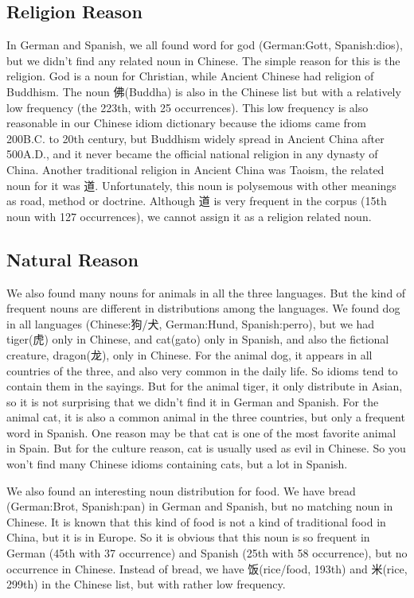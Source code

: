 \subsection{Religion Reason}
In German and Spanish, we all found word for god (German:Gott, Spanish:dios), but we didn't find any related noun in Chinese. The simple reason for this is the religion. God is a noun for Christian, while Ancient Chinese had religion of Buddhism. The noun 佛(Buddha) is also in the Chinese list but with a relatively low frequency (the 223th, with 25 occurrences). This low frequency is also reasonable in our Chinese idiom dictionary because the idioms came from 200B.C. to 20th century, but Buddhism widely spread in Ancient China after 500A.D., and it never became the official national religion in any dynasty of China. Another traditional religion in Ancient China was Taoism, the related noun for it was 道. Unfortunately, this noun is polysemous with other meanings as road, method or doctrine. Although 道 is very frequent in the corpus (15th noun with 127 occurrences), we cannot assign it as a religion related noun. 

\subsection{Natural Reason}
We also found many nouns for animals in all the three languages. But the kind of frequent nouns are different in distributions among the languages. We found dog in all languages (Chinese:狗/犬, German:Hund, Spanish:perro), but we had tiger(虎) only in Chinese, and cat(gato) only in Spanish, and also the fictional creature, dragon(龙), only in Chinese. 
For the animal dog, it appears in all countries of the three, and also very common in the daily life. So idioms tend to contain them in the sayings. But for the animal tiger, it only distribute in Asian, so it is not surprising that we didn't find it in German and Spanish. For the animal cat, it is also a common animal in the three countries, but only a frequent word in Spanish. One reason may be that cat is one of the most favorite animal in Spain. But for the culture reason, cat is usually used as evil in Chinese. So you won't find many Chinese idioms containing cats, but a lot in Spanish. 

We also found an interesting noun distribution for food. We have bread (German:Brot, Spanish:pan) in German and Spanish, but no matching noun in Chinese. It is known that this kind of food is not a kind of traditional food in China, but it is in Europe. So it is obvious that this noun is so frequent in German (45th with 37 occurrence) and Spanish (25th with 58 occurrence), but no occurrence in Chinese. Instead of bread, we have 饭(rice/food, 193th) and 米(rice, 299th) in the Chinese list, but with rather low frequency. 

